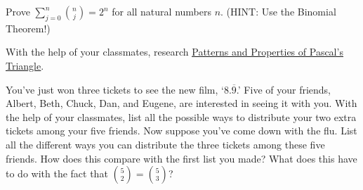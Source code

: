 \documentclass{ximera}
\begin{document}
\begin{problem}
    Prove $\displaystyle{\sum_{j=0}^{n} \binom{n}{j} = 2^{n}}$ for all natural numbers $n$.  (HINT:  Use the Binomial Theorem!)
\end{problem}

\begin{problem}
    With the help of your classmates, research \href{http://en.wikipedia.org/wiki/Pascal's_triangle#Patterns_and_properties}{\underline{Patterns and Properties of Pascal's Triangle}}.  
\end{problem}

\begin{problem}
    You've just won three tickets to see the new film, `$8.\overline{9}$.'  Five of your friends, Albert, Beth, Chuck, Dan, and Eugene, are interested in seeing it with you.  With the help of your classmates, list all the possible ways to distribute your two extra tickets among your five friends.  Now suppose you've come down with the flu.  List all the different ways you can distribute the three tickets among these five friends.  How does this compare with the first list you made?  What does this have to do with the fact that $\binom{5}{2} = \binom{5}{3}$? 
\end{problem}
\end{document}
